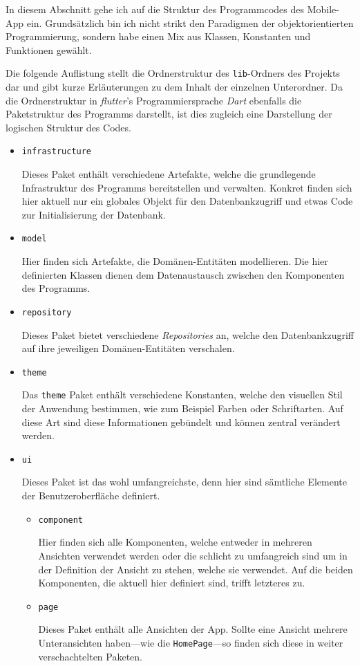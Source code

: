 In diesem Abschnitt gehe ich auf die Struktur des Programmcodes des Mobile-App ein.
Grundsätzlich bin ich nicht strikt den Paradigmen der objektorientierten Programmierung, sondern habe einen Mix aus Klassen, Konstanten und Funktionen gewählt.

Die folgende Auflistung stellt die Ordnerstruktur des \texttt{lib}-Ordners des Projekts dar und gibt kurze Erläuterungen zu dem Inhalt der einzelnen Unterordner.
Da die Ordnerstruktur in \emph{flutter}'s Programmiersprache \emph{Dart} ebenfalls die Paketstruktur des Programms darstellt, ist dies zugleich eine Darstellung der logischen Struktur des Codes.

 \begin{itemize}
   \item \texttt{infrastructure}
   
    Dieses Paket enthält verschiedene Artefakte, welche die grundlegende Infrastruktur des Programms bereitstellen und verwalten.
    Konkret finden sich hier aktuell nur ein globales Objekt für den Datenbankzugriff und etwas Code zur Initialisierung der Datenbank.

   \item \texttt{model}
   
    Hier finden sich Artefakte, die Domänen-Entitäten modellieren.
    Die hier definierten Klassen dienen dem Datenaustausch zwischen den Komponenten des Programms.

   \item \texttt{repository}
   
    Dieses Paket bietet verschiedene \emph{Repositories} an, welche den Datenbankzugriff auf ihre jeweiligen Domänen-Entitäten verschalen.

   \item \texttt{theme}
   
    Das \texttt{theme} Paket enthält verschiedene Konstanten, welche den visuellen Stil der Anwendung bestimmen, wie zum Beispiel Farben oder Schriftarten.
    Auf diese Art sind diese Informationen gebündelt und können zentral verändert werden.

   \item \texttt{ui}
   
    Dieses Paket ist das wohl umfangreichste, denn hier sind sämtliche Elemente der Benutzeroberfläche definiert.
   
   \begin{itemize}
     \item \texttt{component}
     
      Hier finden sich alle Komponenten, welche entweder in mehreren Ansichten verwendet werden oder die schlicht zu umfangreich sind um in der Definition der Ansicht zu stehen, welche sie verwendet.
      Auf die beiden Komponenten, die aktuell hier definiert sind, trifft letzteres zu. 

     \item \texttt{page}
     
     Dieses Paket enthält alle Ansichten der App.
     Sollte eine Ansicht mehrere Unteransichten haben---wie die \texttt{HomePage}---so finden sich diese in weiter verschachtelten Paketen.
   \end{itemize}
 \end{itemize}

